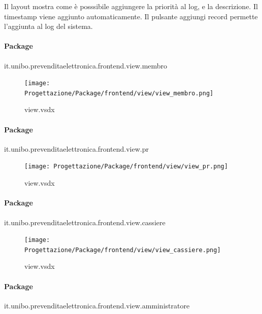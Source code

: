 \documentclass[a4paper]{article}
\begin{document}
Il layout mostra come è posssibile aggiungere la priorità al log, e la descrizione. Il timestamp viene aggiunto automaticamente. Il pulsante aggiungi record permette l'aggiunta al log del sistema.

\newpage

\paragraph{Package} it.unibo.prevenditaelettronica.frontend.view.membro


\begin{figure}[H]
    \texttt{[image: Progettazione/Package/frontend/view/view\_membro.png]}
    \centering
    \caption{view.vsdx}
\end{figure}

\paragraph{Package} it.unibo.prevenditaelettronica.frontend.view.pr


\begin{figure}[H]
    \texttt{[image: Progettazione/Package/frontend/view/view\_pr.png]}
    \centering
    \caption{view.vsdx}
\end{figure}

\paragraph{Package} it.unibo.prevenditaelettronica.frontend.view.cassiere


\begin{figure}[H]
    \texttt{[image: Progettazione/Package/frontend/view/view\_cassiere.png]}
    \centering
    \caption{view.vsdx}
\end{figure}

\paragraph{Package} it.unibo.prevenditaelettronica.frontend.view.amministratore

\end{document}
